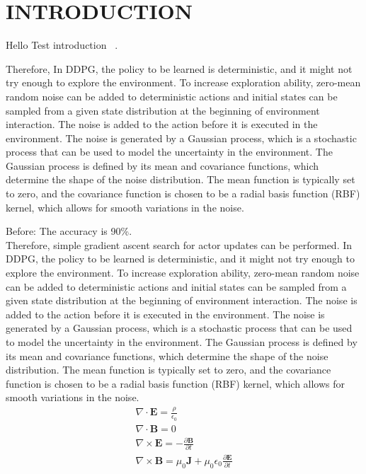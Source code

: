 \section{INTRODUCTION}

Hello Test introduction~ \cite{Sethian1996}.

Therefore, 
In DDPG, the policy to be learned is deterministic, and it might not try
enough to explore the environment. To increase exploration ability,
zero-mean random noise can be added to deterministic actions and initial
states can be sampled from a given state distribution at the beginning
of environment interaction. The noise is added to the action before it
is executed in the environment. The noise is generated by a Gaussian process,
which is a stochastic process that can be used to model the uncertainty in the environment.
The Gaussian process is defined by its mean and covariance functions,
which determine the shape of the noise distribution. The mean function is typically set to zero,
and the covariance function is chosen to
be a radial basis function (RBF) kernel, which allows for smooth variations in the noise.

\begin{revisebox}{3.2} %
    Before: The accuracy is 90\%. \\
    Therefore, simple gradient ascent search for actor updates can be performed.
    In DDPG, the policy to be learned is deterministic, and it might not try
    enough to explore the environment. To increase exploration ability,
    zero-mean random noise can be added to deterministic actions and initial
    states can be sampled from a given state distribution at the beginning
    of environment interaction. The noise is added to the action before it
    is executed in the environment. The noise is generated by a Gaussian process,
    which is a stochastic process that can be used to model the uncertainty in the environment.
    The Gaussian process is defined by its mean and covariance functions,
    which determine the shape of the noise distribution. The mean function is typically set to zero,
    and the covariance function is chosen to
    be a radial basis function (RBF) kernel, which allows for smooth variations in the noise.
    \begin{gather}
        \nabla \cdot \mathbf{E} = \frac{\rho}{\epsilon_0} \\
        \nabla \cdot \mathbf{B} = 0 \\
        \nabla \times \mathbf{E} = -\frac{\partial \mathbf{B}}{\partial t} \\
        \nabla \times \mathbf{B} = \mu_0 \mathbf{J} + \mu_0 \epsilon_0 \frac{\partial \mathbf{E}}{\partial t}
    \end{gather}
\end{revisebox}




